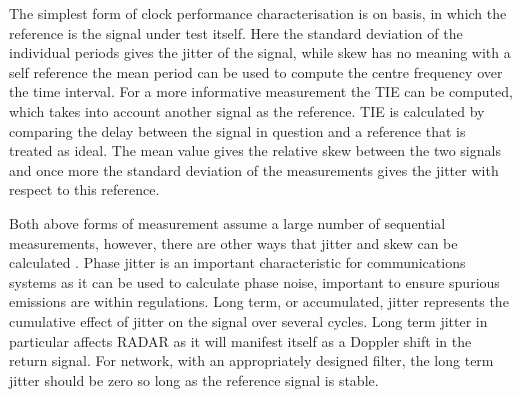 The simplest form of clock performance characterisation is on  basis, in which the reference is the signal under test itself. Here the standard deviation of the individual periods gives the jitter of the signal, while skew has no meaning with a self reference the mean period can be used to compute the centre frequency over the time interval. For a more informative measurement the \ac{TIE} can be computed, which takes into account another signal as the reference. \ac{TIE} is calculated by comparing the delay between the signal in question and a reference that is treated as ideal. The mean value gives the relative skew between the two signals and once more the standard deviation of the measurements gives the jitter with respect to this reference.

Both above forms of measurement assume a large number of sequential measurements, however, there are other ways that jitter and skew can be calculated \cite{AN10007}. Phase jitter is an important characteristic for communications systems as it can be used to calculate phase noise, important to ensure spurious emissions are within regulations. Long term, or accumulated, jitter represents the cumulative effect of jitter on the signal over several cycles. Long term jitter in particular affects \acs*{RADAR} as it will manifest itself as a Doppler shift in the return signal. For  network, with an appropriately designed filter, the long term jitter should be zero so long as the reference signal is stable. %